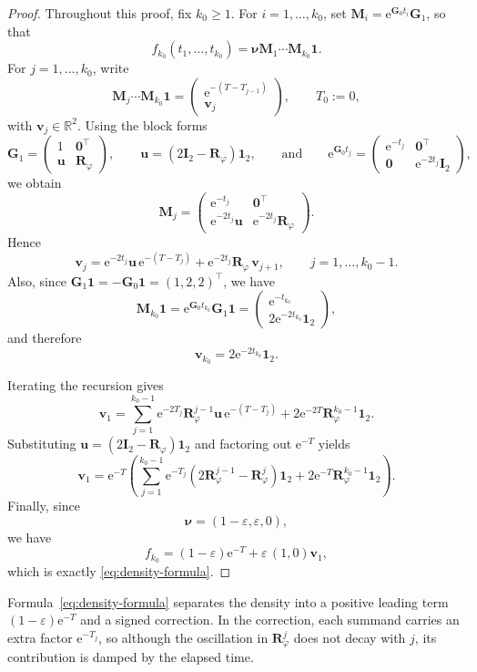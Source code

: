 \documentclass[11pt]{article}
\theoremstyle{definition}
\theoremstyle{remark}
\newcommand{\e}{\mathrm{e}}
\newcommand{\bzero}{\bm{0}}
\begin{document}
\begin{proof}
Throughout this proof, fix ${k_0}\ge 1$. For $i=1,\dots,{k_0}$, set $\bm{M}_i=\e^{\bm{G}_0t_i}\bm{G}_1$, so that
\[
f_{k_0}(t_1,\dots,t_{k_0})=\bm{\nu}\bm{M}_1\cdots \bm{M}_{k_0}\bm{1}.
\]
For $j=1,\dots,{k_0}$, write
\[
\bm{M}_j\cdots \bm{M}_{k_0}\bm{1}
=
\begin{pmatrix}
\e^{-(T-T_{j-1})}\\
\bm{v}_j
\end{pmatrix},
\qquad T_0:=0,
\]
with $\bm{v}_j\in\mathbb{R}^2$. Using the block forms
\[
\bm{G}_1=
\begin{pmatrix}
1 & \bzero^\top\\
\bm{u} & \bm{R}_\varphi
\end{pmatrix},
\qquad
\bm{u}=(2\bm{I}_2-\bm{R}_\varphi)\bm{1}_2,\qquad\mbox{and}\qquad
\e^{\bm{G}_0t_j}
=
\begin{pmatrix}
\e^{-t_j} & \bzero^\top\\
\bzero & \e^{-2t_j}\bm{I}_2
\end{pmatrix},
\]
we obtain
\[
\bm{M}_j
=
\begin{pmatrix}
\e^{-t_j} & \bzero^\top\\
\e^{-2t_j}\bm{u} & \e^{-2t_j}\bm{R}_\varphi
\end{pmatrix}.
\]
Hence
\[
\bm{v}_j
=
\e^{-2t_j}\bm{u}\,\e^{-(T-T_j)}
+
\e^{-2t_j}\bm{R}_\varphi\,\bm{v}_{j+1},
\qquad j=1,\dots,{k_0}-1.
\]
Also, since $\bm{G}_1\bm{1}=-\bm{G}_0\bm{1}= (1, 2, 2)^\intercal$, we have
\[
\bm{M}_{k_0}\bm{1}
=
\e^{\bm{G}_0t_{k_0}}\bm{G}_1\bm{1}
=
\begin{pmatrix}
\e^{-t_{k_0}}\\
2\e^{-2t_{k_0}}\bm{1}_2
\end{pmatrix},
\]
and therefore
\[
\bm{v}_{k_0}=2\e^{-2t_{k_0}}\bm{1}_2.
\]

Iterating the recursion gives
\[
\bm{v}_1
=
\sum_{j=1}^{{k_0}-1}
\e^{-2T_j}\bm{R}_\varphi^{j-1}\bm{u}\,\e^{-(T-T_j)}
+
2\e^{-2T}\bm{R}_\varphi^{{k_0}-1}\bm{1}_2.
\]
Substituting $\bm{u}=(2\bm{I}_2-\bm{R}_\varphi)\bm{1}_2$ and factoring out $\e^{-T}$ yields
\[
\bm{v}_1
=
\e^{-T}
\left(
\sum_{j=1}^{{k_0}-1}
\e^{-T_j}(2\bm{R}_\varphi^{j-1}-\bm{R}_\varphi^j)\bm{1}_2
+
2\e^{-T}\bm{R}_\varphi^{{k_0}-1}\bm{1}_2
\right).
\]
Finally, since
\[
\bm{\nu}=(1-\varepsilon,\varepsilon,0),
\]
we have
\[
f_{k_0}
=
(1-\varepsilon)\e^{-T}
+
\varepsilon\,(1,0)\bm{v}_1,
\]
which is exactly \eqref{eq:density-formula}.
\end{proof}

Formula~\eqref{eq:density-formula} separates the density into a positive leading term $(1-\varepsilon)\e^{-T}$ and a signed correction. In the correction, each summand carries an extra factor \(\e^{-T_j}\), so although the oscillation in \(\bm{R}_\varphi^j\) does not decay with \(j\), its contribution is damped by the elapsed time.
\end{document}
